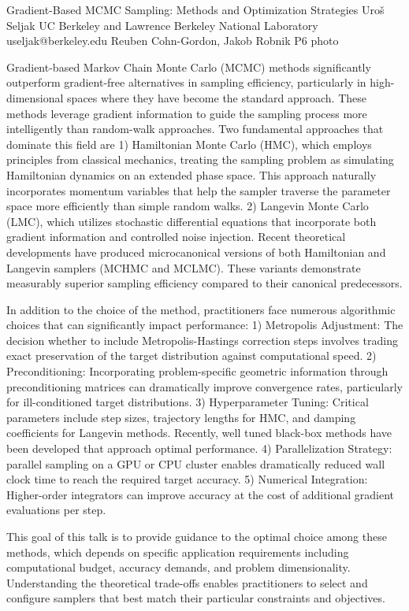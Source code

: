 \begin{talk}
  {Gradient-Based MCMC Sampling: Methods and Optimization Strategies}%
  {Uro\v s Seljak}%
  {UC Berkeley and Lawrence Berkeley National Laboratory}%
  {useljak@berkeley.edu}%
  {Reuben Cohn-Gordon, Jakob Robnik}%
  {}%
  {}%
  {P6}%
  {photo}%
			
Gradient-based Markov Chain Monte Carlo (MCMC) methods significantly outperform gradient-free alternatives in sampling efficiency, particularly in high-dimensional spaces where they have become the standard approach. These methods leverage gradient information to guide the sampling process more intelligently than random-walk approaches.
Two fundamental approaches that dominate this field are 1)
Hamiltonian Monte Carlo (HMC), which  employs principles from classical mechanics, treating the sampling problem as simulating Hamiltonian dynamics on an extended phase space. This approach naturally incorporates momentum variables that help the sampler traverse the parameter space more efficiently than simple random walks. 2)
Langevin Monte Carlo (LMC), which utilizes stochastic differential equations that incorporate both gradient information and controlled noise injection. 
Recent theoretical developments have produced microcanonical versions of both Hamiltonian and Langevin samplers (MCHMC and MCLMC). These variants demonstrate measurably superior sampling efficiency compared to their canonical predecessors.

In addition to the choice of 
the method, 
practitioners face numerous algorithmic choices that can significantly impact performance:
1) Metropolis Adjustment: The decision whether to include Metropolis-Hastings correction steps involves trading exact preservation of the target distribution against computational speed.
2) Preconditioning: Incorporating problem-specific geometric information through preconditioning matrices can dramatically improve convergence rates, particularly for ill-conditioned target distributions.
3) Hyperparameter Tuning: Critical parameters include step sizes, trajectory lengths for HMC, and damping coefficients for Langevin methods. Recently, well tuned black-box methods have been developed that approach optimal performance. 
4) Parallelization Strategy: parallel sampling on a GPU or CPU cluster enables dramatically reduced wall clock time to reach the required target accuracy. 
5) Numerical Integration: Higher-order integrators can improve accuracy at the cost of additional gradient evaluations per step.

This goal of this talk is to provide
guidance to 
the optimal choice among these methods, which depends on specific application requirements including computational budget, accuracy demands, and problem dimensionality. Understanding the theoretical trade-offs enables practitioners to select and configure samplers that best match their particular constraints and objectives.


\end{talk}

